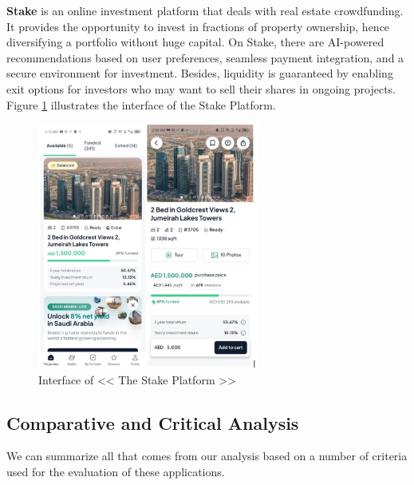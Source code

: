 \textbf{\textcolor{primary}{Stake}} is an online investment platform that deals with real estate crowdfunding. It provides the opportunity to invest in fractions of property ownership, hence diversifying a portfolio without huge capital. On Stake, there are AI-powered recommendations based on user preferences, seamless payment integration, and a secure environment for investment. Besides, liquidity is guaranteed by enabling exit options for investors who may want to sell their shares in ongoing projects. Figure \ref{fig:stake-platform} illustrates the interface of the Stake Platform.

\newpage
\thispagestyle{empty}
\newpage

\begin{figure}[htbp]
    \centering
    \includegraphics[width=0.65\textwidth]{images/Interface-of-the Stake Platform.png}
    \caption{Interface of << The Stake Platform >>}
    \label{fig:stake-platform}
\end{figure}

\subsection{Comparative and Critical Analysis}

We can summarize all that comes from our analysis based on a number of criteria used for the evaluation of these applications.

